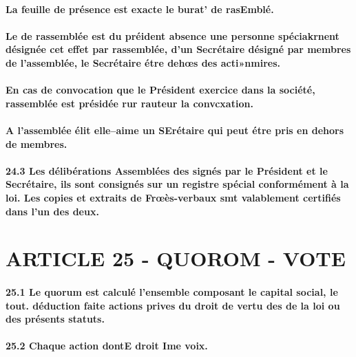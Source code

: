 \documentclass[a4paper, 11pt]{article}
\begin{document}
\paragraph{
  La feuille de présence est exacte le burat' de rasEmblé.
}

\paragraph{
  Le de rassemblée est du préident absence une personne spéciakrnent désignée cet effet par rassemblée, d'un Secrétaire désigné par membres de l'assemblée, le Secrétaire étre dehœs des acti»nmires.
}

\paragraph{
  En cas de convocation que le Président exercice dans la société, rassemblée est présidée rur rauteur la convcxation.
}

\paragraph{
  A l'assemblée élit elle--aime un SErétaire qui peut étre pris en dehors de membres.
}

\paragraph{
  24.3 Les délibérations Assemblées des signés par le Président et le Secrétaire, ils sont consignés sur un registre spécial conformément à la loi. Les copies et extraits de Frœès-verbaux smt valablement certifiés dans l'un des deux.
}

\section*{ARTICLE 25 - QUOROM - VOTE}

\paragraph{
  25.1 Le quorum est calculé l'ensemble composant le capital social, le tout.  déduction faite actions prives du droit de vertu des de la loi ou des présents statuts.
}

\paragraph{
  25.2 Chaque action dontE droit Ime voix.
}
\end{document}

